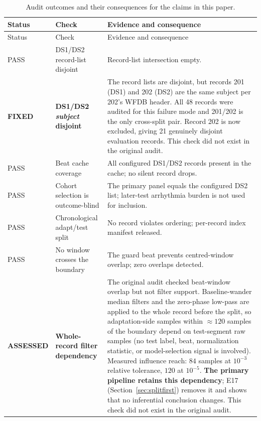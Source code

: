 \begingroup
\small
\setlength{\LTcapwidth}{\textwidth}
\begin{longtable}{lp{3.5cm}p{5.4cm}}
\caption{Audit outcomes and their consequences for the claims in this paper.}
\label{tab:audit}\\
\toprule
Status & Check & Evidence and consequence \\
\midrule
\endfirsthead
\toprule
Status & Check & Evidence and consequence \\
\midrule
\endhead
\bottomrule
\endfoot
PASS & DS1/DS2 record-list disjoint & Record-list intersection empty. \\
\textbf{FIXED} & \textbf{DS1/DS2 \emph{subject} disjoint} & The record lists are disjoint, but records 201 (DS1) and 202 (DS2) are the same subject per 202's WFDB header. All 48 records were audited for this failure mode and 201/202 is the only cross-split pair. Record 202 is now excluded, giving 21 genuinely disjoint evaluation records. This check did not exist in the original audit. \\
PASS & Beat cache coverage & All configured DS1/DS2 records present in the cache; no silent record drops. \\
PASS & Cohort selection is outcome-blind & The primary panel equals the configured DS2 list; later-test arrhythmia burden is not used for inclusion. \\
PASS & Chronological adapt/test split & No record violates ordering; per-record index manifest released. \\
PASS & No window crosses the boundary & The guard beat prevents centred-window overlap; zero overlaps detected. \\
\textbf{ASSESSED} & \textbf{Whole-record filter dependency} & The original audit checked beat-window overlap but not filter support. Baseline-wander median filters and the zero-phase low-pass are applied to the whole record before the split, so adaptation-side samples within $\approx 120$ samples of the boundary depend on test-segment raw samples (no test label, beat, normalization statistic, or model-selection signal is involved). Measured influence reach: $84$ samples at $10^{-3}$ relative tolerance, $120$ at $10^{-5}$. \textbf{The primary pipeline retains this dependency}; E17 (Section~\ref{sec:splitfirst}) removes it and shows that no inferential conclusion changes. This check did not exist in the original audit. \\


\end{longtable}
